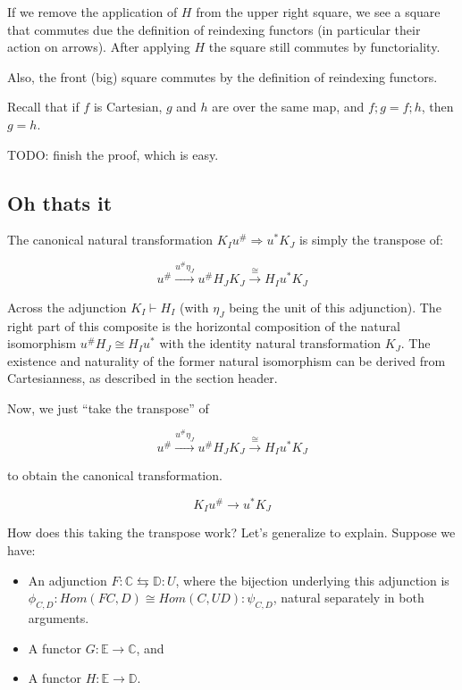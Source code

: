 \documentclass{article}
\begin{document}
If we remove the application of $H$ from the upper right square, we see a square that commutes due the definition of reindexing functors (in particular their action on arrows). After applying $H$ the square still commutes by functoriality. 

Also, the front (big) square commutes by the definition of reindexing functors.

Recall that if $f$ is Cartesian, $g$ and $h$ are over the same map, and $f;g = f;h$, then $g = h$.

TODO: finish the proof, which is easy.

\subsection*{Oh thats it}

The canonical natural transformation $K_I u^{\#} \Rightarrow u^* K_J$ is simply the transpose of:

$$u^{\#} \overset{u^{\#}\eta_J}{\longrightarrow} u^{\#} H_J K_J \overset{\cong}{\longrightarrow} H_I u^* K_J $$

Across the adjunction $K_I \vdash H_I$ (with $\eta_J$ being the unit of this adjunction). 
The right part of this composite is the horizontal composition of the natural isomorphism $u^{\#}H_J \cong H_I u^*$ with
the identity natural transformation $K_J$. The existence and
naturality of the former natural isomorphism can be derived from Cartesianness, as described in the section header.

Now, we just ``take the transpose'' of 

$$u^{\#} \overset{u^{\#}\eta_J}{\longrightarrow} u^{\#} H_J K_J \overset{\cong}{\longrightarrow} H_I u^* K_J $$

to obtain the canonical transformation.

$$K_I u^{\#} \to u^* K_J $$

How does this taking the transpose work? Let's generalize to explain.
Suppose we have:

\begin{itemize}
\item An adjunction $F : \mathbb C \leftrightarrows \mathbb D : U$, where the bijection underlying this adjunction
 is $\phi_{C,D} : Hom(FC,D) \cong Hom(C,UD) : \psi_{C,D}$, natural separately in both arguments.
\item A functor $G : \mathbb E \to \mathbb C$, and
\item A functor $H : \mathbb E \to \mathbb D$.
\end{itemize}
\end{document}
